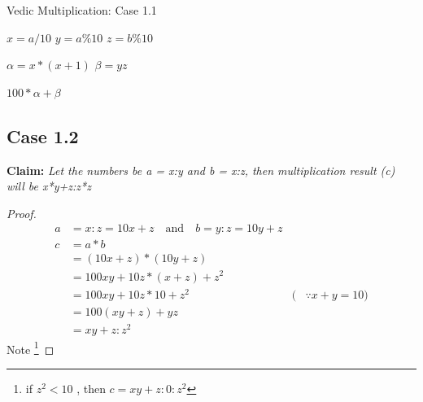 \documentclass{article}
\begin{document}
        \begin{algorithm}
      	\caption{Vedic Multiplication: Case 1.1}
        \label{algo1}
        \begin{algorithmic}[1]
            
                \Statex $x = a/10$
                \Statex $y = a\%10$
                \Statex $z = b\%10$
                
                \Statex $\alpha = x*(x+1)$
                \Statex $\beta = yz$
                
                \Return $100*\alpha + \beta$
                
            \EndProcedure
        \end{algorithmic}
    \end{algorithm}

    \newpage
    
    \subsection*{Case 1.2}
    
        \textbf{Claim:} \emph{Let the numbers be a = x:y and b = x:z, then multiplication result (c) will be x*y+z:z*z}
        \begin{proof}
            \begin{align*}
                a &= x:z = 10x + z \quad \textrm{and} \quad b = y:z = 10y + z\\
                c &= a*b \\
                &= (10x + z) * (10y + z) \\
                &= 100xy + 10z * (x+z) + z^{2}\\
                &= 100xy + 10z * 10 + z^{2} &(&\because x+y = 10)\\
                &= 100(xy + z) + yz \\
                &= xy+z:z^{2}
            \end{align*}
            Note \footnote[1]{if $z^{2} < 10$ , then $c = xy+z:0:z^{2}$}
        \end{proof}
        
\end{document}
